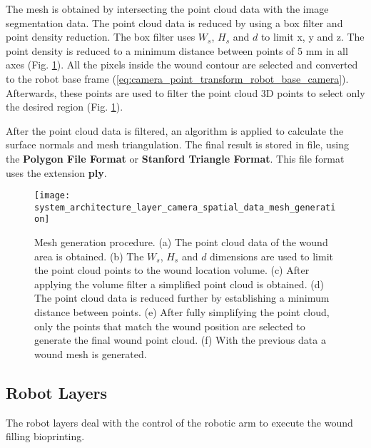The mesh is obtained by intersecting the point cloud data with the image segmentation data. The point cloud data is reduced by using a box filter and point density reduction. The box filter uses $W_s$, $H_s$ and $d$ to limit x, y and z. The point density is reduced to a minimum distance between points of 5 \si{\milli \meter} in all axes (Fig. \ref{fig:system_architecture_layer_camera_spatial_data_mesh_generation}). All the pixels inside the wound contour are selected and converted to the robot base frame (\ref{eq:camera_point_transform_robot_base_camera}). Afterwards, these points are used to filter the point cloud 3D points to select only the desired region (Fig. \ref{fig:system_architecture_layer_camera_spatial_data_mesh_generation}).

After the point cloud data is filtered, an algorithm is applied to calculate the surface normals and mesh triangulation. The final result is stored in file, using the \textbf{Polygon File Format} or \textbf{Stanford Triangle Format}. This file format uses the extension \textbf{ply}.

\begin{figure}[htbp]
	\centering
	\texttt{[image: system\_architecture\_layer\_camera\_spatial\_data\_mesh\_generation]}
	\caption{Mesh generation procedure. (a) The point cloud data of the wound area is obtained. (b) The $W_s$, $H_s$ and $d$ dimensions are used to limit the point cloud points to the wound location volume. (c) After applying the volume filter a simplified point cloud is obtained. (d) The point cloud data is reduced further by establishing a minimum distance between points. (e) After fully simplifying the point cloud, only the points that match the wound position are selected to generate the final wound point cloud. (f) With the previous data a wound mesh is generated. }
	\label{fig:system_architecture_layer_camera_spatial_data_mesh_generation}
\end{figure}



\subsection{Robot Layers}
\label{subsec:system_architectural_robot_layers}

The robot layers deal with the control of the robotic arm to execute the wound filling bioprinting.

